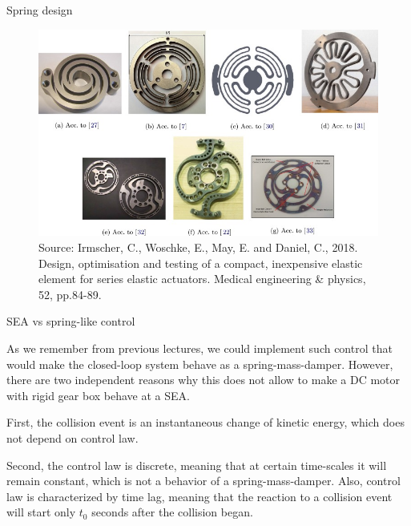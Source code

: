 \documentclass{beamer}
\begin{document}
\begin{frame}{Spring design}
	\begin{flushleft}
		
		\begin{figure}
			\centering
			\includegraphics[width=0.9\linewidth]{SEA_spring}
			\caption{Source: Irmscher, C., Woschke, E., May, E. and Daniel, C., 2018. Design, optimisation and testing of a compact, inexpensive elastic element for series elastic actuators. Medical engineering \& physics, 52, pp.84-89.}
			\label{fig:seaspring}
		\end{figure}
		
		
		
	\end{flushleft}
\end{frame}




\begin{frame}{SEA vs spring-like control}
	\begin{flushleft}
		
		As we remember from previous lectures, we could implement such control that would make the closed-loop system behave as a spring-mass-damper. However, there are two independent reasons why this does not allow to make a DC motor with rigid gear box behave at a SEA.
		
		\bigskip
		
		First, the collision event is an instantaneous change of kinetic energy, which does not depend on control law. 
		
		\bigskip
		
		Second, the control law is discrete, meaning that at certain time-scales it will remain constant, which is not a behavior of a spring-mass-damper. Also, control law is characterized by time lag, meaning that the reaction to a collision event will start only $t_0$ seconds after the collision began. 
		
	\end{flushleft}
\end{frame}



\myqrframe
\end{document}
